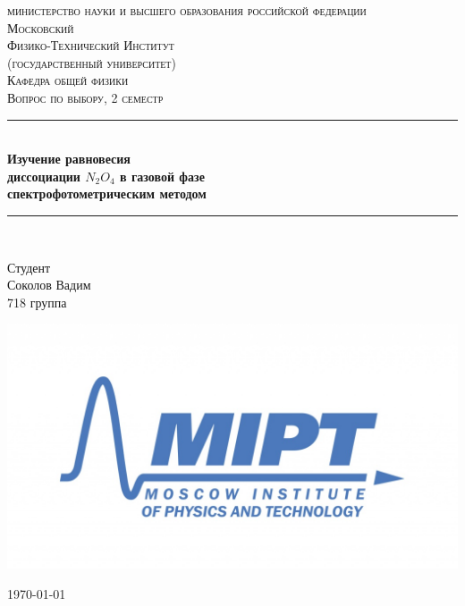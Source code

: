 \documentclass[a4paper,12pt]{article} %
\newenvironment{bottompar}{\par\vspace*{\fill}}{\clearpage}
\begin{document}


\begin{titlepage}
\newcommand{\HRule}{\rule{\linewidth}{0.5mm}} %

\center %
 
\textsc{\LARGE министерство науки и высшего образования российской федерации\\[0.1cm]
\Large Московский\\[-0.2cm]Физико-Технический Институт\\[0.1cm]\large (государственный университет)}\\[1.5cm] %
\textsc{\Large Кафедра общей физики}\\[0.2cm] %
\textsc{\large Вопрос по выбору, 2 семестр}\\[0.5cm] %

\HRule
\\[0.1cm]
{ \large \bfseries Изучение равновесия 
\\[0.0cm] диссоциации  \(N_2O_4\) в газовой фазе \\[0.1cm] спектрофотометрическим методом} %
\HRule
\\[1.5cm]

\begin{flushleft} \large
	\textsf{Студент}\\[0.1cm]
	Соколов Вадим \\
	718 группа
\end{flushleft}

\begin{bottompar}
	\begin{center}
		\includegraphics[width = 80 mm]{logo.jpg}
	\end{center}
	{\large \today}

\end{bottompar}
\vfill
\end{titlepage}
\end{document}
